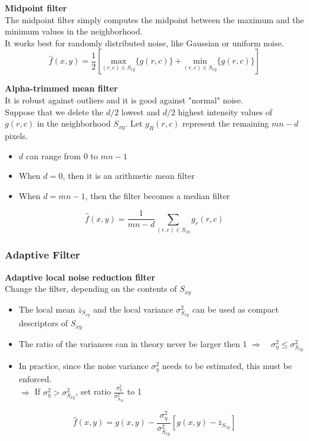 \textbf{Midpoint filter}\\
The midpoint filter simply computes the midpoint between the maximum and the minimum values in the neighborhood. \\
It works best for randomly distributed noise, like Gaussian or uniform noise.
\begin{equation}
	\hat{f}(x,y)=\frac{1}{2} \left[ \underset{(r,c) \in S_{xy}}{\text{max}}\{g(r,c) \} + \underset{(r,c) \in S_{xy}}{\text{min}}\{g(r,c) \}\right]
\end{equation}

\textbf{Alpha-trimmed mean filter}\\
It is robust against outliers and it is good against "normal" noise.\\

Suppose that we delete the $d/2$ lowest and $d/2$ highest intensity values of $g(r,c)$ in the neighborhood $S_{xy}$. Let $g_R(r,c)$ represent the remaining $mn-d$ pixels.
\begin{itemize}
	\item $d$ can range from 0 to $mn-1$
	\item When $d=0$, then it is an arithmetic mean filter
	\item When $d=mn-1$, then the filter becomes a median filter
\end{itemize}
\begin{equation}
	\hat{f}(x,y)=\frac{1}{mn-d} \sum\limits_{(r,c)\in S_{xy}} g_r(r,c)
\end{equation}

\subsubsection{Adaptive Filter }
\textbf{Adaptive local noise reduction filter}\\
Change the filter, depending on the contents of $S_{xy}$
\begin{itemize}
	\item The local mean $\overline{z}_{S_{xy}}$ and the local variance $\sigma_{S_{xy}}^2$ can be used as compact descriptors of $S_{xy}$
	\item The ratio of the variances can in theory never be larger then 1 $\Rightarrow \quad\sigma_{\eta}^2 \le \sigma_{S_{xy}}^2$
	\item In practice, since the noise variance $\sigma_{\eta}^2$ needs to be estimated, this must be enforced.\\
	$\Rightarrow$ If $\sigma_{\eta}^2 > \sigma_{S_{xy}}^2$, set ratio $\frac{\sigma_{\eta}^2}{\sigma_{S_{xy}}^2}$ to 1
\end{itemize}
\begin{equation}
	\hat{f}(x,y)=g(x,y) - \frac{\sigma_{\eta}^2}{\sigma_{S_{xy}}^2} \left[g(x,y)-\overline{z}_{S_{xy}} \right]
\end{equation}


